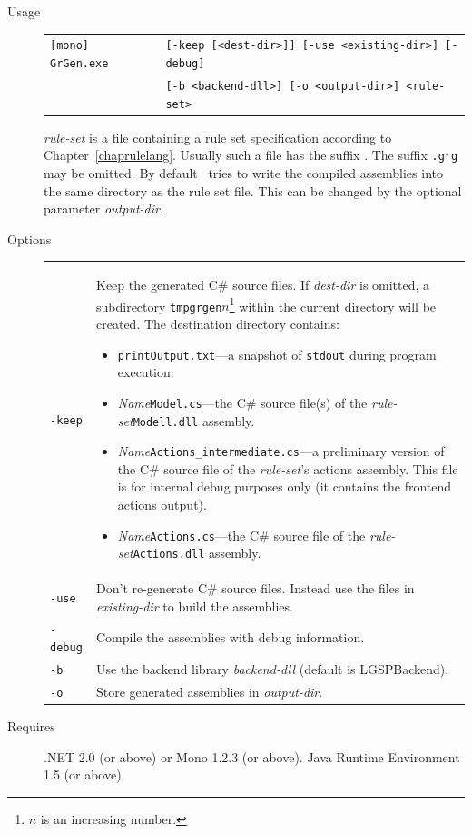 \begin{description}
  \item[Usage] \begin{tabular*}{\linewidth}{@{}l@{}l}\texttt{[mono] GrGen.exe } & \texttt{[-keep [<dest-dir>]] [-use <existing-dir>] [-debug]}\\
        &\texttt{[-b <backend-dll>] [-o <output-dir>] <rule-set>}\end{tabular*}
    \emph{rule-set} is a file containing a rule set specification according to Chapter~\ref{chaprulelang}. Usually such a file has the suffix \texttt{}. The suffix \texttt{.grg} may be omitted.
By default \GrG\ tries to write the compiled assemblies into the same directory as the rule set file. This can be changed by the optional parameter \emph{output-dir}.
  \item[Options] \mbox{} 
    \begin{tabularx}{\linewidth}{lX}
      \texttt{-keep} & Keep the generated C\# source files. If \emph{dest-dir} is omitted, a subdirectory \texttt{tmpgrgen$n$}\footnote{$n$ is an increasing number.} within the current directory will be created. The destination directory contains:
\begin{itemize}
  \item \texttt{printOutput.txt}---a snapshot of \texttt{stdout} during program execution.
  \item \emph{Name}\texttt{Model.cs}---the C\# source file(s) of the \emph{rule-set}\texttt{Modell.dll} assembly.
  \item \emph{Name}\texttt{Actions\_intermediate.cs}---a preliminary version of the C\# source file of the \emph{rule-set}'s actions assembly. 
	This file is for internal debug purposes only (it contains the frontend actions output).
  \item \emph{Name}\texttt{Actions.cs}---the C\# source file of the \emph{rule-set}\texttt{Actions.dll} assembly.
\end{itemize}\\
      \texttt{-use} & Don't re-generate C\# source files. Instead use the files in \emph{existing-dir} to build the assemblies.\\	
      \texttt{-debug} & Compile the assemblies with debug information.\\
      \texttt{-b} & Use the backend library \emph{backend-dll} (default is LGSPBackend).\\
      \texttt{-o} & Store generated assemblies in \emph{output-dir}.
    \end{tabularx}
  \item[Requires] .NET 2.0 (or above) or Mono 1.2.3 (or above). Java Runtime Environment 1.5 (or above).
\end{description}

